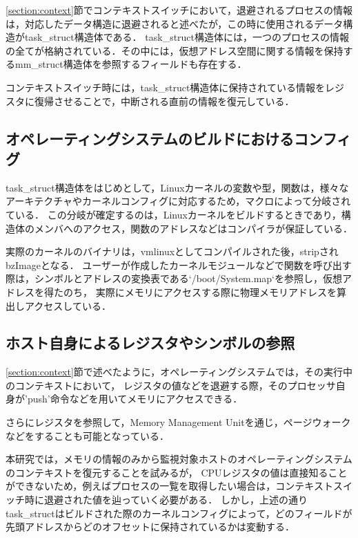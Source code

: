 \ref{section:context}節でコンテキストスイッチにおいて，退避されるプロセスの情報は，対応したデータ構造に退避されると述べたが，この時に使用されるデータ構造がtask\_struct構造体である．
task\_struct構造体には，一つのプロセスの情報の全てが格納されている．その中には，仮想アドレス空間に関する情報を保持するmm\_struct構造体を参照するフィールドも存在する．

コンテキストスイッチ時には，task\_struct構造体に保持されている情報をレジスタに復帰させることで，中断される直前の情報を復元している．

\subsection{オペレーティングシステムのビルドにおけるコンフィグ}

task\_struct構造体をはじめとして，Linuxカーネルの変数や型，関数は，様々なアーキテクチャやカーネルコンフィグに対応するため，マクロによって分岐されている．
この分岐が確定するのは，Linuxカーネルをビルドするときであり，構造体のメンバへのアクセス，関数のアドレスなどはコンパイラが保証している．

実際のカーネルのバイナリは，vmlinuxとしてコンパイルされた後，stripされbzImageとなる．
ユーザーが作成したカーネルモジュールなどで関数を呼び出す際は，シンボルとアドレスの変換表である`/boot/System.map`を参照し，仮想アドレスを得たのち，
実際にメモリにアクセスする際に物理メモリアドレスを算出しアクセスしている．

\subsection{ホスト自身によるレジスタやシンボルの参照}

\ref{section:context}節で述べたように，オペレーティングシステムでは，その実行中のコンテキストにおいて，
レジスタの値などを退避する際，そのプロセッサ自身が'push'命令などを用いてメモリにアクセスできる．

さらにレジスタを参照して，Memory Management Unitを通じ，ページウォークなどをすることも可能となっている．

本研究では，メモリの情報のみから監視対象ホストのオペレーティングシステムのコンテキストを復元することを試みるが，
CPUレジスタの値は直接知ることができないため，例えばプロセスの一覧を取得したい場合は，コンテキストスイッチ時に退避された値を辿っていく必要がある．
しかし，上述の通りtask\_structはビルドされた際のカーネルコンフィグによって，どのフィールドが先頭アドレスからどのオフセットに保持されているかは変動する．

